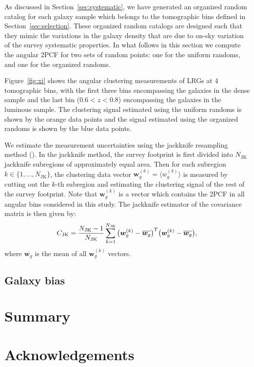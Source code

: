 \documentclass[fleqn,usenatbib,useAMS]{mnras}
\newcommand{\be}{\begin{equation}}
\newcommand{\ee}{\end{equation}}
\newcommand{\dk}{\boldsymbol{w}_{g}^{(k)}}
\newcommand{\dbar}{\overline{\boldsymbol{w}_{g}}}
\newcommand{\njk}{N_{\rm JK}}
\begin{document}
As discussed in Section~\ref{sec:systematic}, we have generated an organized random catalog for each galaxy sample which belongs to the tomographic bins defined in Section~\ref{sec:selection}. These organized random catalogs are designed such that they mimic the variations in the galaxy density that are due to on-sky variation of the survey systematic properties. In what follows in this section we compute the angular 2PCF for two sets of random points: one for the uniform randoms, and one for the organized randoms.

Figure~\ref{fig:xi} shows the angular clustering measurements of LRGs at 4 tomographic bins, with the first three bins encompassing the galaxies in the dense sample and the last bin ($0.6<z<0.8$) encompassing the galaxies in the luminous sample. The clustering signal estimated using the uniform randoms is shown by the orange data points and the signal estimated using the organized randoms is shown by the blue data points. 

We estimate the measurement uncertainties using the jackknife resampling method (\citealt{norberg2009,oliver2016,singh2017,shirasaki2017}). 
In the jackknife method, the survey footprint is first divided into $N_{\mathrm{JK}}$ jackknife subregions of approximately equal area. 
Then for each subregion $k\in\{1,...,N_{\mathrm{JK}}\}$, the clustering data vector $\boldsymbol{w}_{g}^{(k)} = \langle w^{(k)}_{g}\rangle$ is measured by cutting out the $k$-th subregion and estimating the clustering signal of the rest of the survey footprint. Note that $\boldsymbol{w}_{g}^{(k)}$ is a vector which contains the 2PCF in all angular bins considered in this study. The jackknife estimator of the covariance matrix is then given by:
\be 
C_{\rm JK} = \frac{\njk - 1}{\njk}\sum_{k=1}^{\njk}\big(\dk-\dbar\big)^{T}\big(\dk-\dbar\big), 
\label{eq:jk}
\ee
where $\dbar$ is the mean of all $\boldsymbol{w}_{g}^{(k)}$ vectors. 


\subsection{Galaxy bias}
\section{Summary}\label{sec:summary} 





\section*{Acknowledgements}
\end{document}
